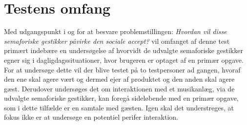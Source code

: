 \section{Testens omfang}
\label{TestensOmfangSocialAccept}
%
Med udgangspunkt i og for at besvare problemstillingen: \textit{Hvordan vil disse semaforiske gestikker påvirke den sociale accept?} vil omfanget af denne test primært indebære en undersøgelse af hvorvidt de udvalgte semaforiske gestikker egner sig i dagligdagssituationer, hvor brugeren er optaget af en primær opgave. For at undersøge dette vil der blive testet på to testpersoner ad gangen, hvoraf den ene skal agere vært og dermed ejer af produktet og den anden skal agere gæst. Derudover undersøges det om interaktionen med et musikanlæg, via de udvalgte semaforiske gestikker, kan foregå sideløbende med en primær opgave, som i dette tilfælde er en samtale med gæsten. Igen skal det understreges, at fokus ikke er at undersøge en potentiel perifer interaktion. 



